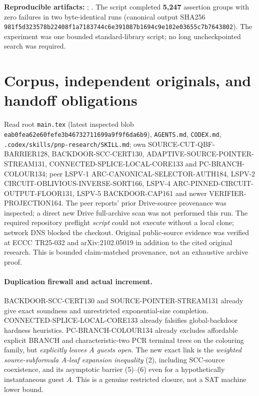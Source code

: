 \documentclass[11pt]{article}
\begin{document}
\noindent\textbf{Reproducible artifacts:}
;
.
The script completed \textbf{5,247} assertion groups with zero failures in two byte-identical runs (canonical output SHA256 \texttt{981f5d323578b22408f1a7183744c6e391087b1694c9e102e03655c7b7643802}). The experiment was one bounded standard-library script; no long uncheckpointed search was required.

\section{Corpus, independent originals, and handoff obligations}
Read root \texttt{main.tex} (latest inspected blob \texttt{eab0fea62e60fefe3b46732711699a9f9f6da6b9}), \texttt{AGENTS.md}, \texttt{CODEX.md}, \texttt{.codex/skills/pnp-research/SKILL.md}; own SOURCE-CUT-QBF-BARRIER128, BACKDOOR-SCC-CERT130, ADAPTIVE-SOURCE-POINTER-STREAM131, CONNECTED-SPLICE-LOCAL-CORE133 and PC-BRANCH-COLOUR134; peer LSPV-1 ARC-CANONICAL-SELECTOR-AUTH184, LSPV-2 CIRCUIT-OBLIVIOUS-INVERSE-SORT166, LSPV-4 ARC-PINNED-CIRCUIT-OUTPUT-FLOOR131, LSPV-5 BACKDOOR-CAP161 and newer VERIFIER-PROJECTION164. The peer reports' prior Drive-source provenance was inspected; a direct new Drive full-archive scan was not performed this run. The required repository preflight \emph{script} could not execute without a local clone; network DNS blocked the checkout. Original public-source evidence was verified at ECCC TR25-032 and arXiv:2102.05019 in addition to the cited original research. This is bounded claim-matched provenance, not an exhaustive archive proof.

\paragraph{Duplication firewall and actual increment.} BACKDOOR-SCC-CERT130 and SOURCE-POINTER-STREAM131 already give exact soundness and unrestricted exponential-size completion. CONNECTED-SPLICE-LOCAL-CORE133 already falsifies global-backdoor hardness heuristics. PC-BRANCH-COLOUR134 already excludes affordable explicit BRANCH and characteristic-two PCR terminal trees on the colouring family, but \emph{explicitly leaves $A$ guests open}. The new exact link is the \emph{weighted source-subformula $A$-leaf expansion inequality} (2), including SCC-source coexistence, and its asymptotic barrier (5)--(6) even for a hypothetically instantaneous guest $A$. This is a genuine restricted closure, not a SAT machine lower bound.
\end{document}

